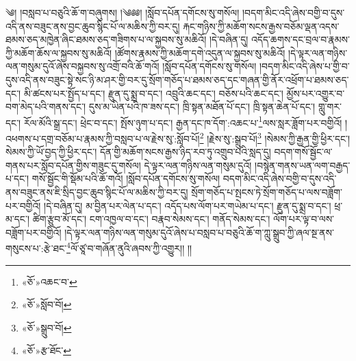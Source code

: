༄། །བསླབ་པ་བཅུའི་ཆོ་ག་བཞུགས། །༄༅༅། །སློབ་དཔོན་དགོངས་སུ་གསོལ། །བདག་མིང་འདི་ཞེས་བགྱི་བ་དུས་འདི་ནས་བཟུང་ནས་བྱང་ཆུབ་སྙིང་པོ་ལ་མཆིས་ཀྱི་བར་དུ། རྐང་གཉིས་ཀྱི་མཆོག་སངས་རྒྱས་བཅོམ་ལྡན་འདས་ཐམས་ཅད་མཁྱེན་ཞིང་ཐམས་ཅད་གཟིགས་པ་ལ་སྐྱབས་སུ་མཆིའོ། །དེ་བཞིན་དུ། འདོད་ཆགས་དང་བྲལ་བ་རྣམས་ཀྱི་མཆོག་ཆོས་ལ་སྐྱབས་སུ་མཆིའོ། །ཚོགས་རྣམས་ཀྱི་མཆོག་དགེ་འདུན་ལ་སྐྱབས་སུ་མཆིའོ། །དེ་ལྟར་ལན་གཉིས་ལན་གསུམ་དུའོ་ཞེས་བསྐྱབས་སུ་འགྲོ་བའི་ཆོ་གའོ། །སློབ་དཔོན་དགོངས་སུ་གསོལ། །བདག་མིང་འདི་ཞེས་པ་གྱི་བ་དུས་འདི་ནས་བཟུང་སྟེ་སང་ཉི་མ་ཤར་གྱི་བར་དུ་སྲོག་གཅོད་པ་ཐམས་ཅད་དང་གཞན་གྱི་ནོར་འཕྲོག་པ་ཐམས་ཅད་དང་། མི་ཚངས་པར་སྤྱོད་པ་དང་། རྫུན་དུ་སྨྲ་བ་དང་། འབྲུའི་ཆང་དང་། བཅོས་པའི་ཆང་དང་། མྱོས་པར་འགྱུར་བ་བག་མེད་པའི་གནས་དང་། དུས་མ་ཡིན་པའི་ཁ་ཟས་དང་། ཁྲི་སྟན་མཐོན་པོ་དང་། ཁྲི་སྟན་ཆེན་པོ་དང་། གླུ་གར་དང་། རོལ་མོའི་སྒྲ་དང་། ཕྲེང་བ་དང་། སྤོས་ཉུག་པ་དང་། རྒྱན་དང་ཁ་དོག་:འཆང་པ་\footnote{«ཅོ་»འཆང་བ་}ལས་སླར་ཟློག་པར་བགྱིའོ། །འཕགས་པ་དགྲ་བཅོམ་པ་རྣམས་ཀྱི་བསླབ་པ་ལ་རྗེས་སུ་:སློབ་པོ།\footnote{«ཅོ་»སློབ་བོ།} །རྗེས་སུ་:སྒྲུབ་པོ།\footnote{«ཅོ་»སྒྲུབ་བོ།} །སེམས་ཀྱི་རྒྱན་གྱི་ཕྱིར་དང་། སེམས་ཀྱི་ཡོ་བྱད་ཀྱི་ཕྱིར་དང་། དོན་གྱི་མཆོག་སངས་རྒྱས་ཉིད་རབ་ཏུ་འགྲུབ་པའི་སླད་དུ། བདག་གསོ་སྦྱོང་ལ་གནས་པར་སློབ་དཔོན་གྱིས་གཟུང་དུ་གསོལ། དེ་ལྟར་ལན་གཉིས་ལན་གསུམ་དུའོ། །བསྙེན་གནས་ཡན་ལག་བརྒྱད་པ་དང་། གསོ་སྦྱོང་གི་སྡོམ་པའི་ཆོ་གའོ། །སློབ་དཔོན་དགོངས་སུ་གསོལ། བདག་མིང་འདི་ཞེས་བགྱི་བ་དུས་འདི་ནས་བཟུང་ནས་ཇི་སྲིད་བྱང་ཆུབ་སྙིང་པོ་ལ་མཆིས་ཀྱི་བར་དུ། སྲོག་གཅོད་པ་སྤངས་ཏེ་སྲོག་གཅོད་པ་ལས་བཟློག་པར་བགྱིའོ། །དེ་བཞིན་དུ། མ་བྱིན་པར་ལེན་པ་དང་། འདོད་པས་ལོག་པར་གཡེམ་པ་དང་། རྫུན་དུ་སྨྲ་བ་དང་། ཕྲ་མ་དང་། ཚིག་རྩུབ་མོ་དང་། ངག་འཁྱལ་བ་དང་། བརྣབ་སེམས་དང་། གནོད་སེམས་དང་། ལོག་པར་ལྟ་བ་ལས་བཟློག་པར་བགྱིའོ། །དེ་ལྟར་ལན་གཉིས་ལན་གསུམ་དུའོ་ཞེས་པ་བསླབ་པ་བཅུའི་ཆོ་ག་ཀླུ་སྒྲུབ་ཀྱི་ཞལ་སྔ་ནས་གསུངས་པ་:རྩེ་ཐང་\footnote{«ཅོ་»རྩ་ཐོང་}ལོ་ཙཱ་བ་གཞོན་ནུའི་ཞབས་ཀྱི་འགྱུར།། །།